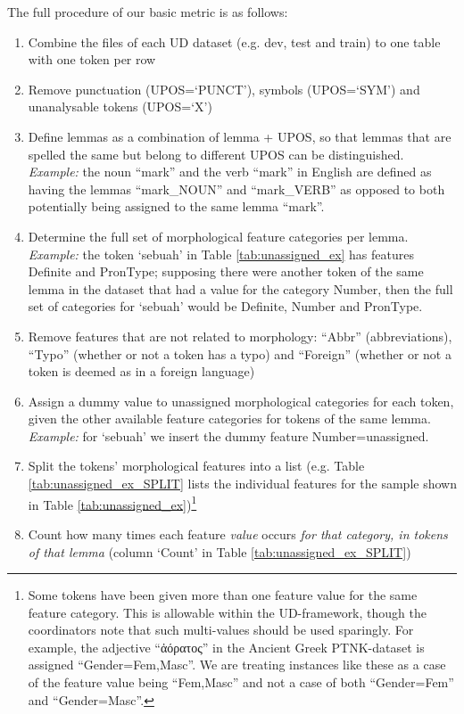 \documentclass[USenglish]{article}
\begin{document}
The full procedure of our basic metric is as follows:
\begin{enumerate}
\item Combine the files of each UD dataset (e.g. dev, test and train) to one table with one token per row
\item Remove punctuation (UPOS=`PUNCT'), symbols (UPOS=`SYM') and unanalysable tokens (UPOS=`X')
\item Define lemmas as a combination of lemma + UPOS, so that lemmas that are spelled the same but belong to different UPOS can be distinguished. \textit{Example:} the noun ``mark'' and the verb ``mark'' in English are defined as having the lemmas ``mark\_NOUN'' and ``mark\_VERB'' as opposed to both potentially being assigned to the same lemma ``mark''.
\item Determine the full set of morphological feature categories per lemma. \textit{Example:} the token `sebuah' in Table \ref{tab:unassigned_ex} has features Definite and PronType; supposing there were another token of the same lemma in the dataset that had a value for the category Number, then the full set of categories for `sebuah' would be Definite, Number and PronType.
\item Remove features that are not related to morphology: ``Abbr'' (abbreviations), ``Typo'' (whether or not a token has a typo) and ``Foreign'' (whether or not a token is deemed as in a foreign language)
\item Assign a dummy value to unassigned morphological categories for each token, given the other available feature categories for tokens of the same lemma. \textit{Example:} for `sebuah' we insert the dummy feature Number=unassigned.
\item Split the tokens' morphological features into a list (e.g. Table \ref{tab:unassigned_ex_SPLIT} lists the individual features for the sample shown in Table \ref{tab:unassigned_ex})\footnote{Some tokens have been given more than one feature value for the same feature category. This is allowable within the UD-framework, though the coordinators note that such multi-values should be used sparingly. For example, the adjective ``{\dolousfont ἀ}{\Timesfont όρατος}'' in the Ancient Greek PTNK-dataset is assigned ``Gender=Fem,Masc''. We are treating instances like these as a case of the feature value being ``Fem,Masc'' and not a case of both ``Gender=Fem'' and ``Gender=Masc''.}
\item Count how many times each feature \textit{value} occurs \textit{for that category, in tokens of that lemma} (column `Count' in Table \ref{tab:unassigned_ex_SPLIT})

\end{enumerate}
\end{document}
